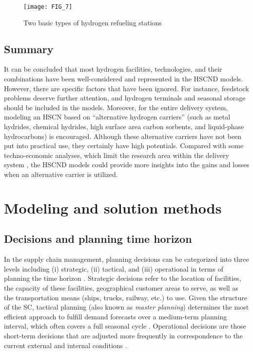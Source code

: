 \documentclass[11pt,3p]{elsarticle}
\begin{document}
\begin{figure}[!htbp]
\centering
\texttt{[image: FIG\_7]}
\caption{\label{fig:TypeHydrogenStation}Two basic types of hydrogen refueling stations}
\end{figure}

\subsection{Summary}

It can be concluded that most hydrogen facilities, technologies, and their combinations have been well-considered and represented in the HSCND models. However, there are specific factors that have been ignored. For instance, feedstock problems deserve further attention, and hydrogen terminals and seasonal storage should be included in the models. Moreover, for the entire delivery system, modeling an HSCN based on ``alternative hydrogen carriers'' (such as metal hydrides, chemical hydrides, high surface area carbon sorbents, and liquid-phase hydrocarbons) is encouraged. Although these alternative carriers have not been put into practical use, they certainly have high potentials. Compared with some techno-economic analyses, which limit the research area within the delivery system \citep{hooks2008,reuss2017seasonal}, the HSCND models could provide more insights into the gains and losses when an alternative carrier is utilized. 

\section{Modeling and solution methods}
\label{sec:model}

\subsection{Decisions and planning time horizon}
\label{sec:decisions}

In the supply chain management, planning decisions can be categorized into three levels including (i) strategic, (ii) tactical, and (iii) operational in terms of planning the time horizon \citep{mula2010mathematical}. Strategic decisions refer to the location of facilities, the capacity of these facilities, geographical customer areas to serve, as well as the transportation means (ships, trucks, railway, etc.) to use. Given the structure of the SC, tactical planning (also known as \textit{master planning}) determines the most efficient approach to fulfill demand forecasts over a medium-term planning interval, which often covers a full seasonal cycle \citep{stadtler2005supply}. Operational decisions are those short-term decisions that are adjusted more frequently in correspondence to the current external and internal conditions \citep{yue2014biomass}.
\end{document}
